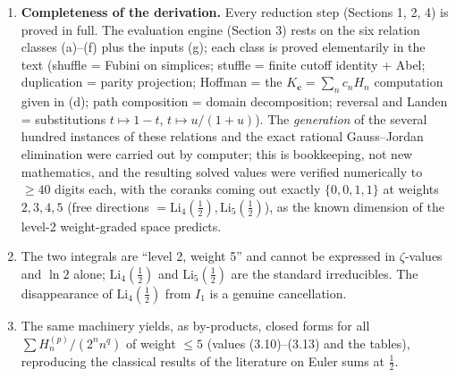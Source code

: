 \documentclass[11pt]{article}
\theoremstyle{remark}
\begin{document}
\begin{enumerate}
\item \textbf{Completeness of the derivation.} Every reduction step (Sections 1, 2, 4) is proved in full. The evaluation engine (Section 3) rests on the six relation classes (a)--(f) plus the inputs (g); each class is proved elementarily in the text (shuffle = Fubini on simplices; stuffle = finite cutoff identity + Abel; duplication = parity projection; Hoffman = the $K_{\mathbf c}=\sum_nc_nH_n$ computation given in (d); path composition = domain decomposition; reversal and Landen = substitutions $t\mapsto1-t$, $t\mapsto u/(1+u)$). The \textit{generation} of the several hundred instances of these relations and the exact rational Gauss--Jordan elimination were carried out by computer; this is bookkeeping, not new mathematics, and the resulting solved values were verified numerically to $\ge40$ digits each, with the coranks coming out exactly $\{0,0,1,1\}$ at weights $2,3,4,5$ (free directions $=\mathrm{Li}_4(\tfrac12),\mathrm{Li}_5(\tfrac12)$), as the known dimension of the level-2 weight-graded space predicts.
\item The two integrals are ``level 2, weight 5'' and cannot be expressed in $\zeta$-values and $\ln 2$ alone; $\mathrm{Li}_4(\tfrac12)$ and $\mathrm{Li}_5(\tfrac12)$ are the standard irreducibles. The disappearance of $\mathrm{Li}_4(\tfrac12)$ from $I_1$ is a genuine cancellation.
\item The same machinery yields, as by-products, closed forms for all $\sum H^{(p)}_n/(2^nn^q)$ of weight $\le5$ (values (3.10)--(3.13) and the tables), reproducing the classical results of the literature on Euler sums at $\tfrac12$.
\end{enumerate}
\end{document}
